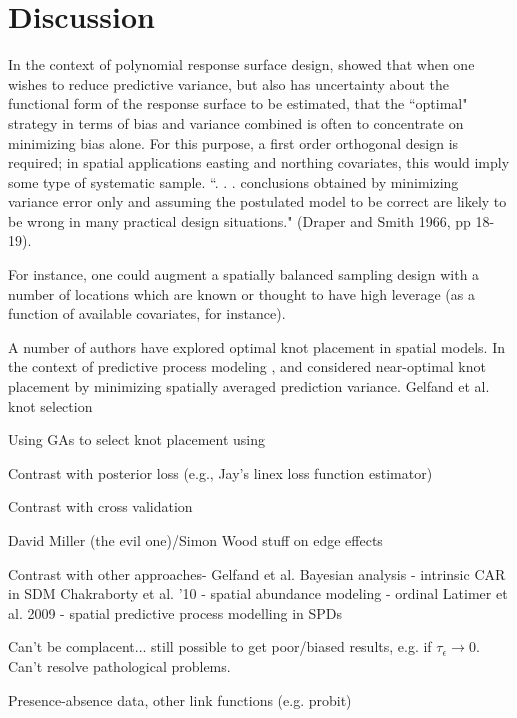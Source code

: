 \documentclass[fleqn,10pt]{wlpeerj}
\begin{document}
\section*{Discussion}


In the context of polynomial response surface design, \citet{BoxDraper1959} showed that when one wishes to reduce predictive variance, but also has uncertainty about the functional form of the response surface to be estimated, that the ``optimal" strategy in terms of bias and variance combined is often to concentrate on minimizing bias alone.  For this purpose, a first order orthogonal design is required; in spatial applications easting and northing covariates, this would imply some type of systematic sample.  ``. . . conclusions obtained by minimizing variance error only and assuming the postulated model to be correct are likely to be wrong in many practical design situations." (Draper and Smith 1966, pp 18-19).

For instance, one could augment a spatially balanced sampling design with a number of locations which are known or thought to have high leverage (as a function of available covariates, for instance).



A number of authors have explored optimal knot placement in spatial models.  In the context of predictive process modeling \citep[where a covariance function is specified over a group of knots; see][]{BanerjeeEtAl2008}, \citet{FinleyEtAl2009} and \citet{GelfandEtAl2013} considered near-optimal knot placement by minimizing spatially averaged prediction variance.
Gelfand et al. knot selection

Using GAs to select knot placement using


Contrast with posterior loss (e.g., Jay's linex loss function estimator)

Contrast with cross validation

David Miller (the evil one)/Simon Wood stuff on edge effects

Contrast with other approaches-
Gelfand et al. Bayesian analysis - intrinsic CAR in SDM
Chakraborty et al. '10 - spatial abundance modeling - ordinal
Latimer et al. 2009 - spatial predictive process modelling in SPDs

Can't be complacent... still possible to get poor/biased results, e.g. if $\tau_\epsilon \rightarrow 0$.  Can't resolve pathological problems.

Presence-absence data, other link functions (e.g. probit)
\end{document}
